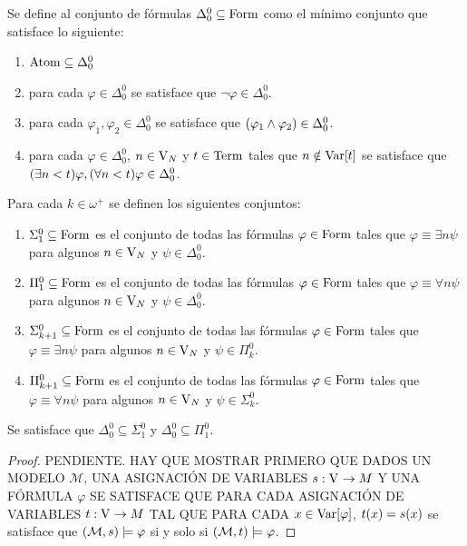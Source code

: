 \begin{definition}
	Se define al conjunto de fórmulas $\Delta_{0}^{0}\subseteq\FORMULAS$ como el mínimo conjunto que satisface lo siguiente:

	\begin{enumerate}
		\item $\ATOMICAS\subseteq\Delta_{0}^{0}$
		\item para cada $\varphi\in\Delta_{0}^{0}$ se satisface que $\neg\varphi\in\Delta_{0}^{0}$.
		\item para cada $\varphi_{1},\varphi_{2}\in\Delta_{0}^{0}$ se satisface que $\pa*{\varphi_{1}\land\varphi_{2}}\in\Delta_{0}^{0}$.
		\item para cada $\varphi\in\Delta_{0}^{0}$, $n\in\VARIABLES[N]$ y $t\in\TERMINOS$ tales que $n\notin\mathrm{Var}\bra*{t}$ se satisface que $\pa*{\exists n < t}\varphi,\pa*{\forall n < t}\varphi\in\Delta_{0}^{0}$.
	\end{enumerate}

	Para cada $k\in\omega^{+}$ se definen los siguientes conjuntos:

	\begin{enumerate}
		\item $\Sigma_{1}^{0}\subseteq\FORMULAS$ es el conjunto de todas las fórmulas $\varphi\in\FORMULAS$ tales que $\varphi\equiv\exists n\psi$ para algunos $n\in\VARIABLES[N]$ y $\psi\in\Delta_{0}^{0}$.
		\item $\Pi_{1}^{0}\subseteq\FORMULAS$ es el conjunto de todas las fórmulas $\varphi\in\FORMULAS$ tales que $\varphi\equiv\forall n\psi$ para algunos $n\in\VARIABLES[N]$ y $\psi\in\Delta_{0}^{0}$.
		\item $\Sigma_{k + 1}^{0}\subseteq\FORMULAS$ es el conjunto de todas las fórmulas $\varphi\in\FORMULAS$ tales que $\varphi\equiv\exists n\psi$ para algunos $n\in\VARIABLES[N]$ y $\psi\in\Pi_{k}^{0}$.
		\item $\Pi_{k + 1}^{0}\subseteq\FORMULAS$ es el conjunto de todas las fórmulas $\varphi\in\FORMULAS$ tales que $\varphi\equiv\forall n\psi$ para algunos $n\in\VARIABLES[N]$ y $\psi\in\Sigma_{k}^{0}$.
	\end{enumerate}
\end{definition}

\begin{theorem}
	Se satisface que $\Delta_{0}^{0}\subseteq\Sigma_{1}^{0}$ y $\Delta_{0}^{0}\subseteq\Pi_{1}^{0}$.
\end{theorem}

\begin{proof}
	PENDIENTE. HAY QUE MOSTRAR PRIMERO QUE DADOS UN MODELO $\mathcal{M}$, UNA ASIGNACIÓN DE VARIABLES $s:\VARIABLES\to M$ Y UNA FÓRMULA $\varphi$ SE SATISFACE QUE PARA CADA ASIGNACIÓN DE VARIABLES $t:\VARIABLES\to M$ TAL QUE PARA CADA $x\in\mathrm{Var}\bra*{\varphi}$, $t\pa*{x} = s\pa*{x}$ se satisface que $\pa*{\mathcal{M}, s}\models\varphi$ si y solo si $\pa*{\mathcal{M}, t}\models\varphi$.
\end{proof}

